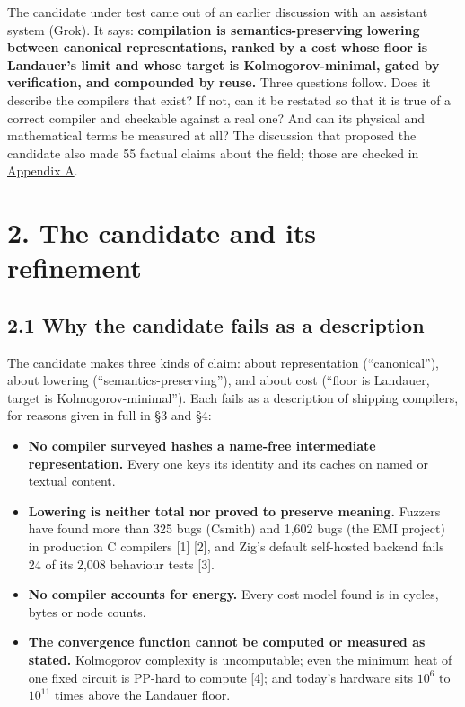 \documentclass[10pt,letterpaper]{article}
\providecommand{\tightlist}{\setlength{\itemsep}{1pt}\setlength{\parskip}{0pt}}
\begin{document}
The candidate under test came out of an earlier discussion with an
assistant system (Grok). It says: \textbf{compilation is
semantics-preserving lowering between canonical representations, ranked
by a cost whose floor is Landauer's limit and whose target is
Kolmogorov-minimal, gated by verification, and compounded by reuse.}
Three questions follow. Does it describe the compilers that exist? If
not, can it be restated so that it is true of a correct compiler and
checkable against a real one? And can its physical and mathematical
terms be measured at all? The discussion that proposed the candidate
also made 55 factual claims about the field; those are checked in
\href{https://research.openie.dev/papers/rce-compile/\#appendix-a-claims-checked}{Appendix
A}.

\section{2. The candidate and its
refinement}\label{the-candidate-and-its-refinement}

\subsection{2.1 Why the candidate fails as a
description}\label{why-the-candidate-fails-as-a-description}

The candidate makes three kinds of claim: about representation
(``canonical''), about lowering (``semantics-preserving''), and about
cost (``floor is Landauer, target is Kolmogorov-minimal''). Each fails
as a description of shipping compilers, for reasons given in full in §3
and §4:

\begin{itemize}
\tightlist
\item
  \textbf{No compiler surveyed hashes a name-free intermediate
  representation.} Every one keys its identity and its caches on named
  or textual content.
\item
  \textbf{Lowering is neither total nor proved to preserve meaning.}
  Fuzzers have found more than 325 bugs (Csmith) and 1,602 bugs (the EMI
  project) in production C compilers {[}1{]} {[}2{]}, and Zig's default
  self-hosted backend fails 24 of its 2,008 behaviour tests {[}3{]}.
\item
  \textbf{No compiler accounts for energy.} Every cost model found is in
  cycles, bytes or node counts.
\item
  \textbf{The convergence function cannot be computed or measured as
  stated.} Kolmogorov complexity is uncomputable; even the minimum heat
  of one fixed circuit is PP-hard to compute {[}4{]}; and today's
  hardware sits \(10^6\) to \(10^{11}\) times above the Landauer floor.
\end{itemize}
\end{document}
